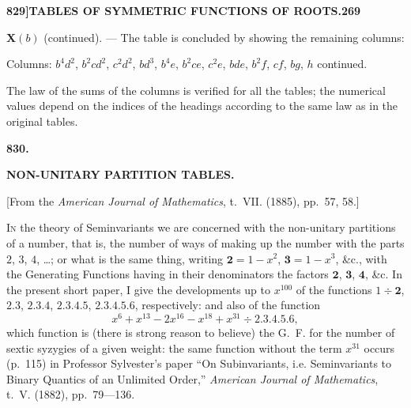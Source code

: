 \documentclass[12pt,a4paper]{article}
\theoremstyle{definition}
\begin{document}
\newpage
\setcounter{page}{269}

\noindent\textbf{829]}\hfill\textbf{TABLES OF SYMMETRIC FUNCTIONS OF ROOTS.}\hfill\textbf{269}

\bigskip

\noindent\textbf{X$(b)$} (continued). --- The table is concluded by showing the remaining columns:

\medskip

\noindent Columns: $b^4d^2$, $b^2cd^2$, $c^2d^2$, $bd^3$, $b^4e$, $b^2ce$, $c^2e$, $bde$, $b^2f$, $cf$, $bg$, $h$ continued.

\medskip


\medskip

\noindent The law of the sums of the columns is verified for all the tables; the numerical values depend on the indices of the headings according to the same law as in the original tables.

\newpage
\setcounter{page}{273}


\begin{center}
\Large\textbf{830.}

\bigskip

\Large\textbf{NON-UNITARY PARTITION TABLES.}
\end{center}

\begin{center}
[From the \textit{American Journal of Mathematics}, t.~VII. (1885), pp.~57, 58.]
\end{center}

\noindent\textsc{In} the theory of Seminvariants we are concerned with the non-unitary partitions of a number, that is, the number of ways of making up the number with the parts $2$, $3$, $4$, \dots; or what is the same thing, writing $\mathbf{2} = 1 - x^2$, $\mathbf{3} = 1 - x^3$, \&c., with the Generating Functions having in their denominators the factors $\mathbf{2}$, $\mathbf{3}$, $\mathbf{4}$, \&c. In the present short paper, I give the developments up to $x^{100}$ of the functions $1 \div \mathbf{2}$, $\mathbf{2.3}$, $\mathbf{2.3.4}$, $\mathbf{2.3.4.5}$, $\mathbf{2.3.4.5.6}$, respectively: and also of the function
\[
x^6 + x^{13} - 2x^{16} - x^{18} + x^{31} \div \mathbf{2.3.4.5.6},
\]
which function is (there is strong reason to believe) the G.~F. for the number of sextic syzygies of a given weight: the same function without the term $x^{31}$ occurs (p.~115) in Professor Sylvester's paper ``On Subinvariants, i.e. Seminvariants to Binary Quantics of an Unlimited Order,'' \textit{American Journal of Mathematics}, t.~V. (1882), pp.~79---136.
\end{document}

